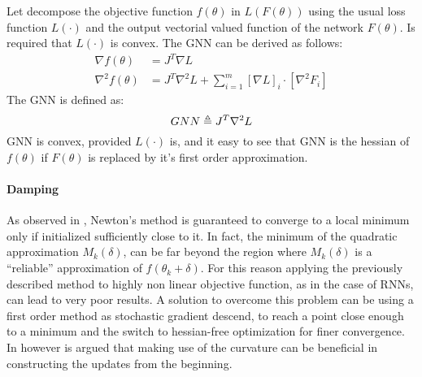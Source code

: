 Let decompose the objective function $f(\theta)$ in $L(F(\theta))$ using the usual loss function $L(\cdot)$ and the output  vectorial valued function of the network $F(\theta)$. Is required that $L(\cdot)$ is convex. The GNN can be derived as follows:
\begin{align}
 \nabla f(\theta) &= J^T\nabla L \\
 \nabla^2f(\theta) &= J^T\nabla^2L + \sum_{i=1}^m[\nabla L]_i \cdot [\nabla^2 F_i]
\end{align}
The GNN is defined as:
\begin{equation}
 GNN \triangleq J^T\nabla^2L
\end{equation}
GNN is convex, provided $L(\cdot)$ is, and it easy to see that GNN is the hessian of $f(\theta)$ if $F(\theta)$ is replaced by it's first order approximation.

\paragraph{Damping}

As observed in \cite{hessianFree}, Newton's method is guaranteed to converge to a local minimum only if initialized sufficiently close to it.
In fact, the minimum of the quadratic approximation $M_k(\delta)$, can be far beyond the region where $M_k(\delta)$ is  a ``reliable'' approximation of $f(\theta_k+\delta)$.
For this reason applying the previously described method to highly non linear objective function, as in the case of RNNs, can lead to very poor results.
A solution to overcome this problem can be using a first order method as stochastic gradient descend, to reach a point close enough to a minimum and the switch to hessian-free optimization for finer convergence. In \cite{hessianFree} however is argued that making use of the curvature can be beneficial in constructing the updates from the beginning.

